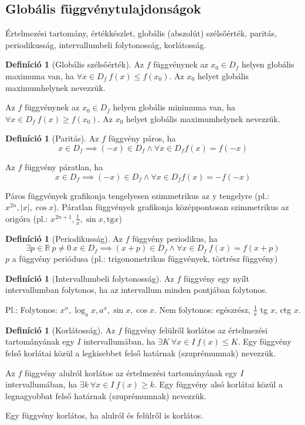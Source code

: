 \documentclass[twoside,12pt]{report}
\theoremstyle{definition}
\newtheorem{definition}[theorem]{Definíció}
\begin{document}
	\subsection{Globális függvénytulajdonságok}
	Értelmezési tartomány, értékkészlet, globális (abszolút) szélsőérték, paritás, periodikusság, intervallumbeli folytonosság, korlátosság.
	\begin{definition}[Globális szélsőérték]
		Az $f$ függvénynek az $x_0\in D_f$ helyen globális maximuma van, ha $\forall x\in D_f\ f(x)\le f(x_0)$. Az $x_0$ helyet globális maximumhelynek nevezzük.
		
		Az $f$ függvénynek az $x_0\in D_f$ helyen globális minimuma van, ha $\forall x\in D_f\ f(x)\ge f(x_0)$. Az $x_0$ helyet globális maximumhelynek nevezzük.
	\end{definition}
	\begin{definition}[Paritás]
		Az $f$ függvény páros, ha \\
		\begin{equation*}
			x\in D_f\implies (-x)\in D_f\wedge\forall x\in D_f f(x)=f(-x)
		\end{equation*}
		
		Az $f$ függvény páratlan, ha \begin{equation*}
			x\in D_f\implies (-x)\in D_f\wedge\forall x\in D_f f(x)=-f(-x)
		\end{equation*}
	\end{definition}
	Páros függvények grafikonja tengelyesen szimmetrikus az y tengelyre (pl.: $x^{2n},|x|,\cos x$). Páratlan függvények grafikonja középpontosan szimmetrikus az origóra (pl.: $x^{2n+1},\frac{1}{x},\sin x,\text{tg} x$)
	\begin{definition}[Periodikusság]
		Az $f$ függvény periodikus, ha 
		\begin{equation*}
			\exists p\in\mathbb{R}\ p\ne0\ x\in D_f\implies (x+p)\in D_f\wedge\forall x\in D_f\ f(x)=f(x+p)
		\end{equation*}
		$p$ a függvény periódusa (pl.: trigonometrikus függvények, törtrész függvény)
	\end{definition}
	\begin{definition}[Intervallumbeli folytonosság]
		Az $f$ függvény egy nyílt intervallumban folytonos, ha az intervallum minden pontjában folytonos.
	\end{definition}
	Pl.: Folytonos: $x^n, \log_a x, a^x, \sin x, \cos x$. Nem folytonos: egészrész, $\frac{1}{x}$ tg $x$, ctg $x$.
	\begin{definition}[Korlátosság]
		Az $f$ függvény felülről korlátos az értelmezési tartományának egy $I$ intervallumában, ha $\exists K\ \forall x\in I\ f(x)\le K$. Egy függvény felső korlátai közül a legkisebbet felső határnak (szuprémumnak) nevezzük.
		
		Az $f$ függvény alulról korlátos az értelmezési tartományának egy $I$ intervallumában, ha $\exists k\ \forall x\in I\ f(x)\ge k$. Egy függvény alsó korlátai közül a legnagyobbat felső határnak (szuprémumnak) nevezzük.
		
		Egy függvény korlátos, ha alulról és felülről is korlátos.
	\end{definition}
\end{document}
